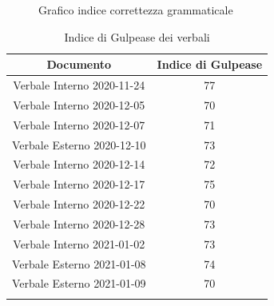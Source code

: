 \begin{center}
\begin{figure}[!htb]
        \caption{Grafico indice correttezza grammaticale}
    \end{figure}
    \begin{center}
        \begin{longtable}{|c|c|}
            \hline
            \rowcolor{lighter-grayer}
            \textbf{Documento}         & \textbf{Indice di Gulpease} \\
            \hline
            \endfirsthead

            \hline
            Verbale Interno 2020-11-24 & 77                          \\
            Verbale Interno 2020-12-05 & 70                          \\
            Verbale Interno 2020-12-07 & 71                          \\
            Verbale Esterno 2020-12-10 & 73                          \\
            Verbale Interno 2020-12-14 & 72                          \\
            Verbale Interno 2020-12-17 & 75                          \\
            Verbale Interno 2020-12-22 & 70                          \\
            Verbale Interno 2020-12-28 & 73                          \\
            Verbale Interno 2021-01-02 & 73                          \\
            Verbale Esterno 2021-01-08 & 74                          \\
            Verbale Esterno 2021-01-09 & 70                          \\
            
            \hline
            \rowcolor{white}
            \caption{Indice di Gulpease dei verbali}
        \end{longtable}
    \end{center}
\end{center}


